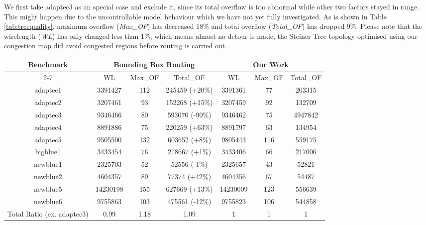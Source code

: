 We first take adaptec3 as an special case and exclude it, since its total overflow is too abnormal while other two factors stayed in range. This might happen due to the uncontrollable model behaviour which we have not yet fully investigated. As is shown in Table \ref{tab:treequality}, maximum overflow (\textit{Max\_OF}) has decreased 18\% and total overflow (\textit{Total\_OF}) has dropped 9\%. Please note that the wirelength (\textit{WL}) has only changed less than 1\%, which means almost no detour is made, the Steiner Tree topology optimised using our congestion map did avoid congested regions before routing is carried out.



\begin{table*}[htbp]
\caption{Result of Steiner Tree quality after edge shifting}
\begin{center}
\begin{tabular}{|c|c|c|c|c|c|c|}
\hline
\multirow{2}{*}{Benchmark} & \multicolumn{3}{c|}{Bounding Box Routing}     & \multicolumn{3}{c|}{Our Work}  \\ \cline{2-7} 
                           & WL       & Max\_OF & Total\_OF      & WL       & Max\_OF & Total\_OF \\ \hline
adaptec1                   & 3391427  & 112     & 245459 (+20\%) & 3391361  & 77      & 203315    \\ \hline
adaptec2                   & 3207461  & 93      & 152268 (+15\%) & 3207459  & 92      & 132709    \\ \hline
adaptec3                   & 9346466  & 80      & 593070 (-90\%) & 9346462  & 75      & 4947842   \\ \hline
adaptec4                   & 8891886  & 75      & 220259 (+63\%) & 8891797  & 63      & 134954    \\ \hline
adaptec5                   & 9505500  & 132     & 603652 (+8\%)  & 9805443  & 116     & 559175    \\ \hline
bigblue1                   & 3433454  & 76      & 218667 (+1\%)  & 3433406  & 66      & 217006    \\ \hline
newblue1                   & 2325703  & 52      & 52556 (-1\%)   & 2325657  & 43      & 52821     \\ \hline
newblue2                   & 4604357  & 89      & 77374 (+42\%)  & 4604356  & 67      & 54487     \\ \hline
newblue5                   & 14230198 & 155     & 627669 (+13\%) & 14230009 & 123     & 556639    \\ \hline
newblue6                   & 9755863  & 103     & 475561 (-12\%) & 9755823  & 106     & 544858    \\ \hline
Total Ratio (ex. adaptec3)       & 0.99     & 1.18    & 1.09           & 1        & 1       & 1         \\ \hline
\end{tabular}
\label{tab:treequality}
\end{center}
\end{table*}

